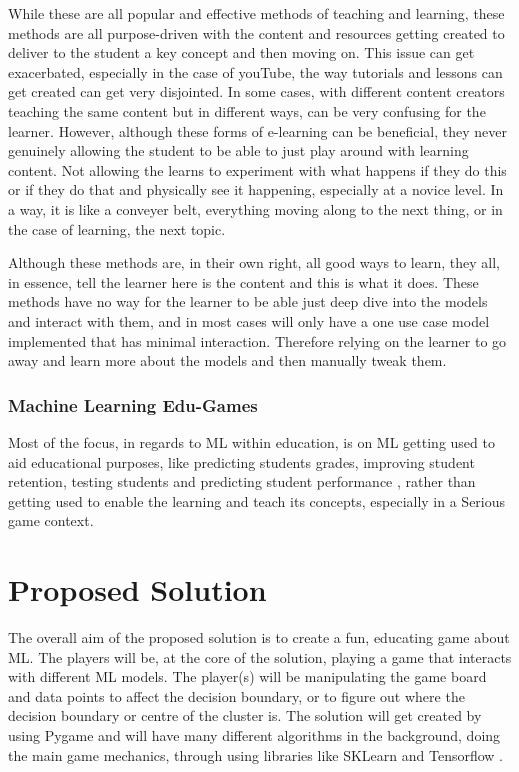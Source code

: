 		While these are all popular and effective methods of teaching and learning, these methods are all purpose-driven with the content and resources getting created to deliver to the student a key concept and then moving on. This issue can get exacerbated, especially in the case of youTube, the way tutorials and lessons can get created can get very disjointed. In some cases, with different content creators teaching the same content but in different ways, can be very confusing for the learner. However, although these forms of e-learning can be beneficial, they never genuinely allowing the student to be able to just play around with learning content. Not allowing the learns to experiment with what happens if they do this or if they do that and physically see it happening, especially at a novice level. In a way, it is like a conveyer belt, everything moving along to the next thing, or in the case of learning, the next topic.
		
		Although these methods are, in their own right, all good ways to learn, they all, in essence, tell the learner here is the content and this is what it does. These methods have no way for the learner to be able just deep dive into the models and interact with them, and in most cases will only have a one use case model implemented that has minimal interaction. Therefore relying on the learner to go away and learn more about the models and then manually tweak them.
		
	
	\subsubsection{Machine Learning Edu-Games}
		\label{sub_sec:ml_edu_games}
		
		Most of the focus, in regards to ML within education, is on ML getting used to aid educational purposes, like predicting students grades, improving student retention, testing students and predicting student performance \cite{kuvcak2018machine}, rather than getting used to enable the learning and teach its concepts, especially in a Serious game context.
	
	\section{Proposed Solution}
	The overall aim of the proposed solution is to create a fun, educating game about ML. The players will be, at the core of the solution, playing a game that interacts with different ML models. The player(s) will be manipulating the game board and data points to affect the decision boundary, or to figure out where the decision boundary or centre of the cluster is. The solution will get created by using  Pygame and will have many different algorithms in the background, doing the main game mechanics, through using libraries like SKLearn \cite{sklearn_api} and Tensorflow \cite{tensorflow2015-whitepaper}.
	

